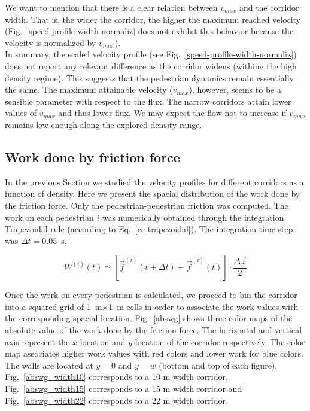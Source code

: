 \documentclass[preprint,12pt]{elsarticle}
\begin{document}
We want to mention that there is a clear relation between $v_{max}$ and the corridor width. That is, the wider the corridor, the higher the maximum reached velocity (Fig.~\ref{speed-profile-width-normaliz} does not exhibit this behavior because the velocity is normalized by $v_{max}$).\\

In summary, the scaled velocity profile (see Fig.~\ref{speed-profile-width-normaliz}) does not report any relevant difference as the corridor widens (withing the high density regime). This suggests that the pedestrian dynamics remain essentially the same. The maximum attainable velocity ($v_{max}$), however, seems to be a sensible parameter with respect to the flux.  The narrow corridors attain lower values of $v_{max}$ and thus lower flux. We may expect the flow not to increase if $v_{max}$ remains low enough along the explored density range.\\

\subsection{Work done by friction force}

In the previous Section we studied the velocity profiles for different corridors as a function of density. Here we present the spacial distribution of the work done by the friction force. Only the pedestrian-pedestrian friction was computed.
The work on each pedestrian $i$ was numerically obtained through the integration Trapezoidal rule (according to Eq.~\ref{ec-trapezoidal}). The integration time step was $\Delta t = 0.05$~s. 

\begin{equation}
W^{(i)}(t) \simeq \left [ \vec{f}^{(i)}(t+\Delta t) + \vec{f}^{(i)}(t)  \right ]\cdot \frac{\Delta \vec{x}}{2} \label{ec-trapezoidal}
\end{equation}

Once the work on every pedestrian is calculated, we proceed to bin the corridor into a squared grid of 1~m$\times$1~m cells in order to associate the work values with the corresponding spacial location. Fig.~\ref{abswg} shows three color maps of the absolute value of the work done by the friction force. The horizontal and vertical axis represent the $x$-location and $y$-location of the corridor respectively. The color map associates higher work values with red colors and lower work for blue colors. The walls are located at $y=0$ and $y=w$ (bottom and top of each figure). Fig.~\ref{abswg_width10} corresponds to a 10 m width corridor, Fig.~\ref{abswg_width15} corresponds to a 15 m width corridor and Fig.~\ref{abswg_width22} corresponds to a 22 m width corridor.\\
\end{document}
